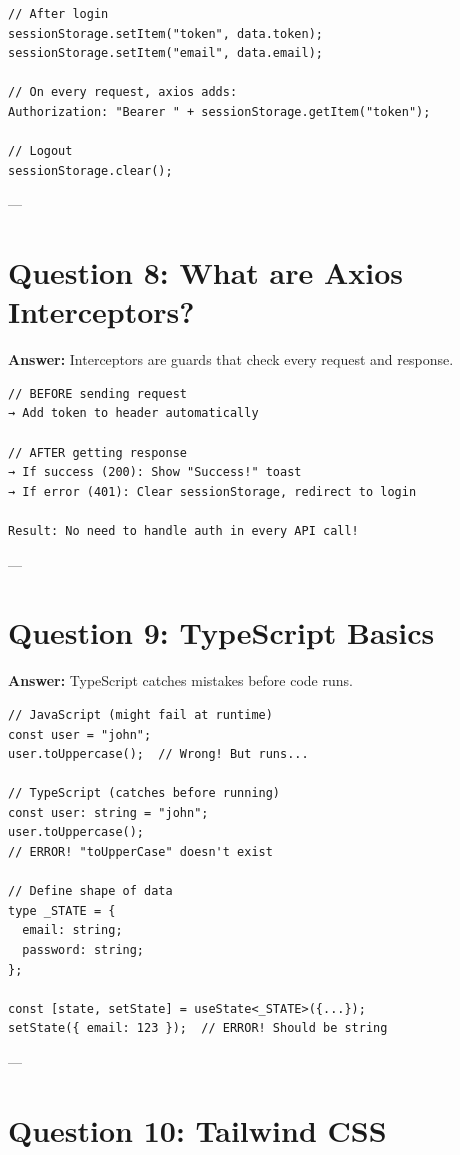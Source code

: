 \documentclass[11pt]{article}
\begin{document}
\begin{lstlisting}
// After login
sessionStorage.setItem("token", data.token);
sessionStorage.setItem("email", data.email);

// On every request, axios adds:
Authorization: "Bearer " + sessionStorage.getItem("token");

// Logout
sessionStorage.clear();
\end{lstlisting}

---

\section*{Question 8: What are Axios Interceptors?}

\textbf{Answer:} Interceptors are guards that check every request and response.

\begin{lstlisting}
// BEFORE sending request
→ Add token to header automatically

// AFTER getting response
→ If success (200): Show "Success!" toast
→ If error (401): Clear sessionStorage, redirect to login

Result: No need to handle auth in every API call!
\end{lstlisting}

---

\section*{Question 9: TypeScript Basics}

\textbf{Answer:} TypeScript catches mistakes before code runs.

\begin{lstlisting}
// JavaScript (might fail at runtime)
const user = "john";
user.toUppercase();  // Wrong! But runs...

// TypeScript (catches before running)
const user: string = "john";
user.toUppercase();  
// ERROR! "toUpperCase" doesn't exist

// Define shape of data
type _STATE = {
  email: string;
  password: string;
};

const [state, setState] = useState<_STATE>({...});
setState({ email: 123 });  // ERROR! Should be string
\end{lstlisting}

---

\section*{Question 10: Tailwind CSS}
\end{document}
